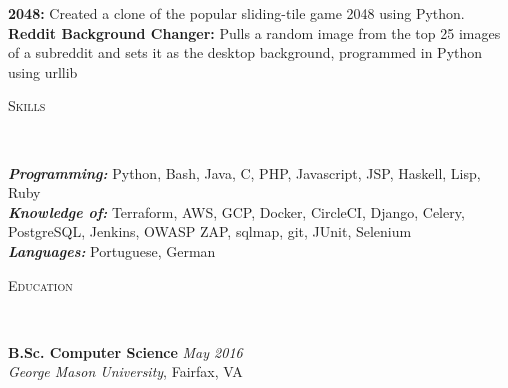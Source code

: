 \documentclass[9pt]{article}
\newenvironment{changemargin}[2]{%
  \begin{list}{}{%
    \setlength{\topsep}{0pt}%
    \setlength{\leftmargin}{#1}%
    \setlength{\rightmargin}{#2}%
    \setlength{\listparindent}{\parindent}%
    \setlength{\itemindent}{\parindent}%
    \setlength{\parsep}{\parskip}%
  }%
  \item[]}{\end{list}
}
\newcommand{\lineover}{
	\begin{changemargin}{-0.05in}{-0.05in}
		\vspace*{-8pt}
		\hrulefill \\
		\vspace*{-2pt}
	\end{changemargin}
}
\newcommand{\header}[1]{
	\begin{changemargin}{-0.5in}{-0.5in}
		\scshape{#1}\\
  	\lineover
	\end{changemargin}
}
\newenvironment{body} {
	\vspace*{-10pt}
	\begin{changemargin}{-0.25in}{-0.5in}
  }	
	{\end{changemargin}
}
\begin{document}
\begin{body}
	\vspace{14pt}
	{\textbf{2048:}}{} Created a clone of the popular sliding-tile game 2048 using Python.\\
	\vspace{4pt}
	{\textbf{Reddit Background Changer:}}{} Pulls a random image from the top 25 images of a subreddit and sets it as the desktop background, programmed in Python using urllib\\
	\vspace{14pt}
\end{body}

\header{Skills}

\begin{body}
	\vspace{14pt}
	\emph{\textbf{Programming:}}{} Python, Bash, Java, C, PHP, Javascript, JSP, Haskell, Lisp, Ruby\\
	\smallskip
	\emph{\textbf{Knowledge of:}}{} Terraform, AWS, GCP, Docker, CircleCI, Django, Celery, PostgreSQL, Jenkins, OWASP ZAP, sqlmap, git, JUnit, Selenium\\
	\smallskip
	\emph{\textbf{Languages:}}{} Portuguese, German\\
\end{body}
\vspace{14pt}
\header{Education}

\begin{body}
	\vspace{14pt}
	\textbf{B.Sc. Computer Science }{} \hfill \emph{May 2016}{}\\
	\emph{George Mason University}, Fairfax, VA\\
	\vspace{4pt}
\end{body}
\smallskip
\end{document}
